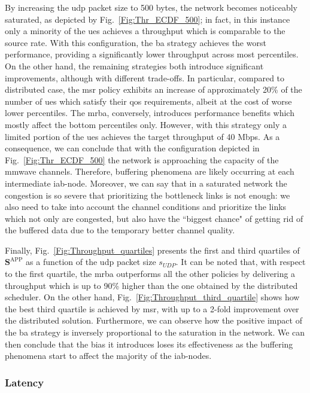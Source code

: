 By increasing the \gls{udp} packet size to 500 bytes, the network becomes noticeably saturated, as depicted by Fig.~\ref{Fig:Thr_ECDF_500}; in fact, in this instance only a minority of the \glspl{ue} achieves a throughput which is comparable to the source rate. With this configuration, the \gls{ba} strategy achieves the worst performance, providing a significantly lower throughput across most percentiles. On the other hand, the remaining strategies both introduce significant improvements, although with different trade-offs. In particular, compared to distributed case, the \gls{msr} policy exhibits an increase of approximately 20\% of the number of \glspl{ue} which satisfy their \gls{qos} requirements, albeit at the cost of worse lower percentiles. The \gls{mrba}, conversely, introduces performance benefits which mostly affect the bottom percentiles only. However, with this strategy only a limited portion of the \glspl{ue} achieves the target throughput of 40 Mbps. 
As a consequence, we can conclude that with the configuration depicted in Fig.~\ref{Fig:Thr_ECDF_500} the network is approaching the capacity of the \gls{mmwave} channels. Therefore, buffering phenomena are likely occurring at each intermediate \gls{iab}-node. Moreover, we can say that in a saturated network the congestion is so severe that prioritizing the bottleneck links is not enough: we also need to take into account the channel conditions and prioritize the links which not only are congested, but also have the ``biggest chance" of getting rid of the buffered data due to the temporary better channel quality.

Finally, Fig.~\ref{Fig:Throughput_quartiles} presents the first and third quartiles of $\mathbf{S}^{\mathrm{APP}}$ as a function of the \gls{udp} packet size $s_{UDP}$. It can be noted that, with respect to the first quartile, the \gls{mrba} outperforms all the other policies by delivering a throughput which is up to 90\% higher than the one obtained by the distributed scheduler. On the other hand, Fig.~\ref{Fig:Throughput_third_quartile} shows how the best third quartile is achieved by \gls{msr}, with up to a 2-fold improvement over the distributed solution. 
Furthermore, we can observe how the positive impact of the \gls{ba} strategy is inversely proportional to the saturation in the network. We can then conclude that the bias it introduces loses its effectiveness as the buffering phenomena start to affect the majority of the \gls{iab}-nodes.

\subsubsection{Latency}

